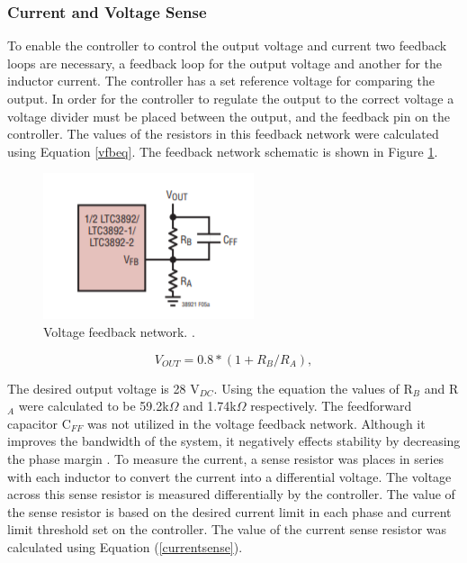 \documentclass[11pt]{article}
\begin{document}
     \subsubsection{Current and Voltage Sense}
    \noindent To enable the controller to control the output voltage and current two feedback loops are necessary, a feedback loop for the output voltage and another for the inductor current. The controller has a set reference voltage for comparing the output. In order for the controller to regulate the output to the correct voltage a voltage divider must be placed between the output, and the feedback pin on the controller. The values of the resistors in this feedback network were calculated using Equation \ref{vfbeq}. The feedback network schematic is shown in Figure \ref{vfbpin}.
    
    \begin{figure} [H]
        \centering
        \includegraphics{vfeedback.PNG}
        \caption{Voltage feedback network. \cite{linear_technology_ltc3892:_nodate}.}
        \label{vfbpin}
    \end{figure}
    
    \begin{equation}
        V_{OUT} = 0.8*(1+R_B/R_A),
        \label{vfbeq}
    \end{equation}
    
    \noindent The desired output voltage is 28 V$_{DC}$. Using the equation the values of R$_B$ and R$_A$ were calculated to be 59.2k$\Omega$ and 1.74k$\Omega$ respectively. The feedforward capacitor C$_{FF}$ was not utilized in the voltage feedback network. Although it improves the bandwidth of the system, it negatively effects stability by decreasing the phase margin \cite{linear_technology_ltc3892:_nodate}.
    \newline
    \newline
    \noindent To measure the current, a sense resistor was places in series with each inductor to convert the current into a differential voltage. The voltage across this sense resistor is measured differentially by the controller. The value of the sense resistor is based on the desired current limit in each phase and current limit threshold set on the controller. The value of the current sense resistor was calculated using Equation (\ref{currentsense}).
    
\end{document}
